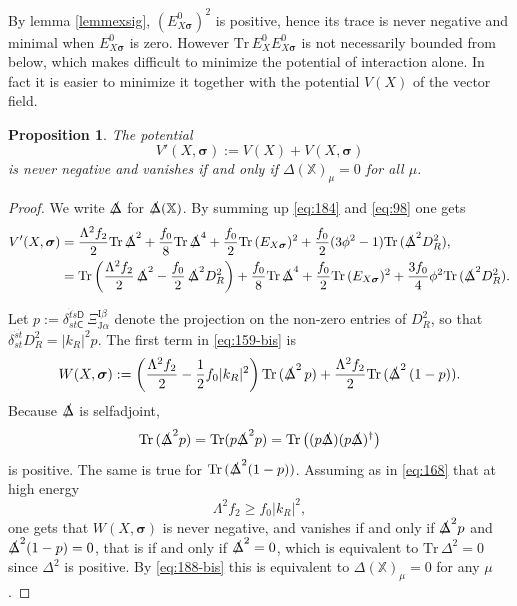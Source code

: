 \documentclass[11pt]{article}
\newcommand{\sig}{{\boldsymbol{\sigma}}}
\newcommand{\XX}{{\mathbb X}}
\newcommand{\sI}{\mathrm  I}
\newcommand{\sJ}{\mathrm J}
\newcommand{\sC}{\mathsf C}
\newcommand{\sD}{\mathsf D}
\newtheorem{prop}{Proposition}[section]
\begin{document}
By lemma \ref{lemmexsig}, $(E_{X\sig}^0)^2$ is positive, hence its
trace is never negative and minimal when $E_{X\sig}^0$ is
zero. However $\text{Tr}\, E_X^0 E_{X\sig}^0$ is not necessarily
bounded from below, which makes difficult to minimize the potential of
interaction alone. In fact it is easier to minimize it together with the
potential $V(X)$ of the vector field.
\begin{prop}\label{propinteract}
  The potential
  \begin{equation}
    \label{eq:152}
      V'(X,\sig):=  V(X) + V(X,\sig)
\end{equation}
is never negative and vanishes if and only if $\Delta(\XX)_\mu=0$ for
all $\mu$.\end{prop}
\begin{proof}
We write $\slashed\Delta$ for $\slashed\Delta(\XX)$. By summing up \eqref{eq:184} and %
\eqref{eq:98} one gets
\begin{align}
  \label{eq:159}
  V'(X,\sig) &= \frac{\Lambda^2 f_2}{2} \text{Tr}\,\slashed\Delta^2 +
  \frac {f_0}8 \text{Tr}\,\slashed\Delta^4 +\frac {f_0}2\text{Tr}\,(E_{X\sig})^2 + \frac{f_0}2
  (3\phi^2-1)\text{Tr}\,(\slashed\Delta^2D_R^2),\\
  \label{eq:159-bis}
&=\text{Tr}\left( \frac{\Lambda^2 f_2}{2} \,\slashed\Delta^2 - \frac {f_0}2 \,
 \slashed\Delta^2D_R^2 \right)+  \frac {f_0}{8} \text{Tr}\,\slashed\Delta^4
  + \frac{f_0}2\text{Tr}\,(E_{X\sig})^2 + \frac{3f_0}4
  \phi^2\text{Tr}\,(\slashed\Delta^2D_R^2).%
\end{align}

Let  $p:=
\delta_{st\sC}^{\dot t\dot s\sD}\,\Xi_{\sJ\alpha}^{\sI\beta}$ denote the
projection on the non-zero entries of $D_R^2$, so that $\delta_{st}^{\dot s\dot t}D_R^2 = |k_R|^2 p$. The first term in \eqref{eq:159-bis}  is
\begin{equation}
  \label{eq:164}
W(X,\sig):= \left( \frac{\Lambda^2 f_2}2 - \frac 12 f_0 |k_R|^2\right)\text{Tr}\,(\slashed\Delta^2\, p)
  +\frac{\Lambda^2 f_2}2 \text{Tr}\,(\slashed\Delta^2\,(1-p)).
\end{equation}
Because $\slashed\Delta$ is selfadjoint, 
\begin{equation}
  \label{eq:165}
  \text{Tr}\, (\slashed\Delta^2 p) = \text{Tr}(p \slashed\Delta^2 p) =
  \text{Tr}\left( (p\slashed\Delta) (p\slashed\Delta)^\dagger\right)
\end{equation}
is positive. The same is true for $\text{Tr}\,(\slashed\Delta^2(1-p))$. Assuming as in \eqref{eq:168} that at high energy
\begin{equation}
  \label{eq:63}
  \Lambda^2 f_2 \geq f_0|k_R|^2,
\end{equation}
one gets that $W(X,\sig)$ is never negative, and vanishes if and only
if 
$\slashed\Delta^2 p$ and $\slashed\Delta^2 (1-p)=0$, that is if and
only if
$\slashed\Delta^2=0$, which is equivalent to $\text{Tr} \,\Delta^2=0$
since
$\Delta^2$ is positive. By \eqref{eq:188-bis} this is equivalent to
$\Delta(\XX)_\mu=0$ for any
$\mu$.


\end{proof}
\end{document}
